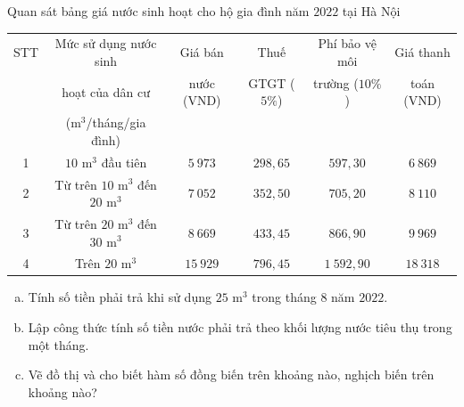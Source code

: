 \begin{bt}%
	Quan sát bảng giá nước sinh hoạt cho hộ gia đình năm $2022$ tại Hà Nội
	\begin{center}
		\begin{tabular}{|c|c|c|c|c|c|}
			\hline
			STT & Mức sử dụng nước sinh & Giá bán & Thuế & Phí bảo vệ môi & Giá thanh \\
			& hoạt của dân cư  & nước (VND) & GTGT ($5\%$) & trường ($10\%$) & toán (VND) \\
			& (m$^3$/tháng/gia đình)        &              &              &                 & \\
			\hline
			1 & $10$ m$^3$ đầu tiên & $5~973$ & $298{,}65$ & $597{,}30$ & $6~869$ \\
			\hline
			2 & Từ trên $10$ m$^3$ đến $20$ m$^3$ & $7~052$ & $352{,}50$ & $705{,}20$ & $8~110$ \\
			\hline
			3 & Từ trên $20$ m$^3$ đến $30$ m$^3$ & $8~669$ & $433{,}45$ & $866{,}90$ & $9~969$ \\
			\hline
			4 & Trên $20$ m$^3$ & $15~929$ & $796{,}45$ & $1~592{,}90$ & $18~318$ \\
			\hline
		\end{tabular}
	\end{center}
	\begin{enumerate}[a)]
		\item Tính số tiền phải trả khi sử dụng $25$ m$^3$ trong tháng $8$ năm $2022$.
		\item Lập công thức tính số tiền nước phải trả theo khối lượng nước tiêu thụ trong một tháng.
		\item Vẽ đồ thị và cho biết hàm số đồng biến trên khoảng nào, nghịch biến trên khoảng nào?
	\end{enumerate}
\end{bt}
